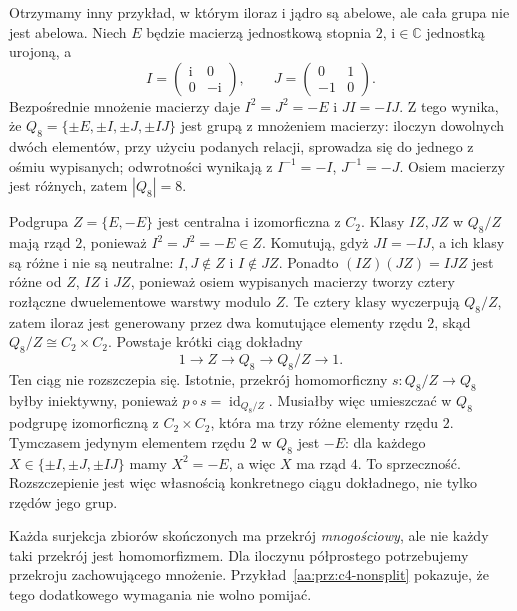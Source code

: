 \begin{przyklad}
\label{aa:prz:q8-nonsplit}
Otrzymamy inny przykład, w którym iloraz i jądro są abelowe,
ale cała grupa nie jest abelowa. Niech $E$ będzie macierzą
jednostkową stopnia $2$, $\mathrm i\in\mathbb C$ jednostką
urojoną, a
\[
 I=\begin{pmatrix}\mathrm i&0\\0&-\mathrm i\end{pmatrix},
 \qquad
 J=\begin{pmatrix}0&1\\-1&0\end{pmatrix}.
\]
Bezpośrednie mnożenie macierzy daje
$I^2=J^2=-E$ i $JI=-IJ$. Z tego wynika, że
$Q_8=\{\pm E,\pm I,\pm J,\pm IJ\}$
jest grupą z mnożeniem macierzy: iloczyn dowolnych dwóch
elementów, przy użyciu podanych relacji, sprowadza się
do jednego z ośmiu wypisanych; odwrotności wynikają
z $I^{-1}=-I$, $J^{-1}=-J$.
Osiem macierzy jest różnych, zatem $|Q_8|=8$.

Podgrupa $Z=\{E,-E\}$ jest centralna i izomorficzna z $C_2$.
Klasy $IZ,JZ$ w $Q_8/Z$ mają rząd $2$, ponieważ
$I^2=J^2=-E\in Z$. Komutują, gdyż $JI=-IJ$, a ich
klasy są różne i nie są neutralne: $I,J\notin Z$ i
$I\notin JZ$. Ponadto $(IZ)(JZ)=IJZ$ jest różne
od $Z$, $IZ$ i $JZ$, ponieważ osiem wypisanych macierzy
tworzy cztery rozłączne dwuelementowe warstwy modulo $Z$.
Te cztery klasy wyczerpują $Q_8/Z$, zatem iloraz
jest generowany przez dwa komutujące elementy rzędu $2$, skąd
$Q_8/Z\cong C_2\times C_2$. Powstaje krótki ciąg dokładny
\[
 1\longrightarrow Z\longrightarrow Q_8
 \longrightarrow Q_8/Z\longrightarrow1.
\]
Ten ciąg nie rozszczepia się. Istotnie, przekrój homomorficzny
$s:Q_8/Z\to Q_8$ byłby iniektywny, ponieważ
$p\circ s=\operatorname{id}_{Q_8/Z}$. Musiałby więc
umieszczać w $Q_8$ podgrupę izomorficzną z
$C_2\times C_2$, która ma trzy różne elementy rzędu $2$.
Tymczasem jedynym elementem rzędu $2$ w $Q_8$ jest $-E$:
dla każdego $X\in\{\pm I,\pm J,\pm IJ\}$ mamy
$X^2=-E$, a więc $X$ ma rząd $4$.
To sprzeczność. Rozszczepienie jest więc własnością
konkretnego ciągu dokładnego, nie tylko rzędów jego grup.
\end{przyklad}

\begin{uwaga}
Każda surjekcja zbiorów skończonych ma przekrój
\emph{mnogościowy}, ale nie każdy taki przekrój jest homomorfizmem.
Dla iloczynu półprostego potrzebujemy przekroju zachowującego
mnożenie. Przykład~\ref{aa:prz:c4-nonsplit} pokazuje,
że tego dodatkowego wymagania nie wolno pomijać.
\end{uwaga}

